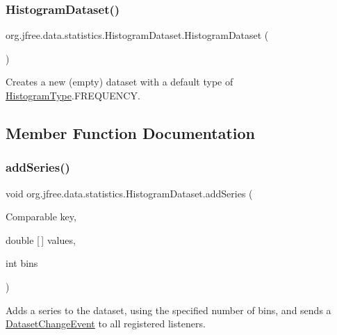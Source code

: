 \subsubsection{\texorpdfstring{Histogram\+Dataset()}{HistogramDataset()}}
{\footnotesize\ttfamily org.\+jfree.\+data.\+statistics.\+Histogram\+Dataset.\+Histogram\+Dataset (\begin{DoxyParamCaption}{ }\end{DoxyParamCaption})}

Creates a new (empty) dataset with a default type of \mbox{\hyperlink{classorg_1_1jfree_1_1data_1_1statistics_1_1_histogram_type}{Histogram\+Type}}.F\+R\+E\+Q\+U\+E\+N\+CY. 

\subsection{Member Function Documentation}
\mbox{\label{classorg_1_1jfree_1_1data_1_1statistics_1_1_histogram_dataset_aa366a1bb3131225602e6ac2ac6ec0710}} 
\subsubsection{\texorpdfstring{add\+Series()}{addSeries()}\hspace{0.1cm}{\footnotesize\ttfamily [1/2]}}
{\footnotesize\ttfamily void org.\+jfree.\+data.\+statistics.\+Histogram\+Dataset.\+add\+Series (\begin{DoxyParamCaption}\item[{Comparable}]{key,  }\item[{double \mbox{[}$\,$\mbox{]}}]{values,  }\item[{int}]{bins }\end{DoxyParamCaption})}

Adds a series to the dataset, using the specified number of bins, and sends a \mbox{\hyperlink{}{Dataset\+Change\+Event}} to all registered listeners.


